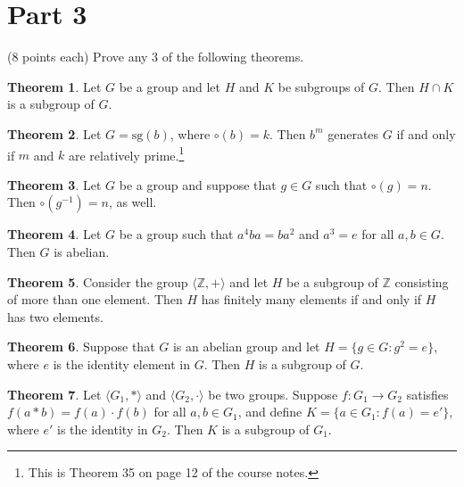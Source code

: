 \documentclass[11pt]{article}
\theoremstyle{definition}
\newtheorem{theorem}{Theorem}
\begin{document}
\section*{Part 3}

(8 points each) Prove any 3 of the following theorems.

\begin{theorem}
Let $G$ be a group and let $H$ and $K$ be subgroups of $G$.  Then $H\cap K$ is a subgroup of $G$.
\end{theorem}

\begin{theorem}
Let $G=\mathrm{sg}(b)$, where $\circ(b)=k$.  Then $b^{m}$ generates $G$ if and only if $m$ and $k$ are relatively prime.\footnote{This is Theorem 35 on page 12 of the course notes.}
\end{theorem}

\begin{theorem}
Let $G$ be a group and suppose that $g\in G$ such that $\circ(g)=n$.  Then $\circ(g^{-1})=n$, as well.
\end{theorem}

\begin{theorem}
Let $G$ be a group such that $a^4 ba=ba^2$ and $a^3=e$ for all $a,b\in G$.  Then $G$ is abelian.
\end{theorem}

\begin{theorem}
Consider the group $\langle \mathbb{Z},+\rangle$ and let $H$ be a subgroup of $\mathbb{Z}$ consisting of more than one element.  Then $H$ has finitely many elements if and only if $H$ has two elements.
\end{theorem}

\begin{theorem}
Suppose that $G$ is an abelian group and let $H=\{g\in G: g^2=e\}$, where $e$ is the identity element in $G$.  Then $H$ is a subgroup of $G$.
\end{theorem}

\begin{theorem}
Let $\langle G_1,*\rangle$ and $\langle G_2,\cdot \rangle$ be two groups.  Suppose $f:G_1\to G_2$ satisfies $f(a* b)=f(a)\cdot f(b)$ for all $a,b\in G_1$, and define $K=\{a\in G_1:f(a)=e'\}$, where $e'$ is the identity in $G_2$.  Then $K$ is a subgroup of $G_1$.
\end{theorem}
\end{document}
